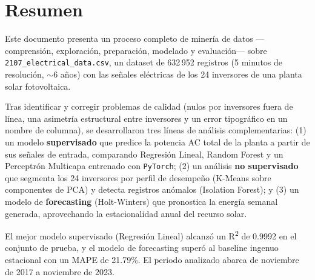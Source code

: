 \section*{Resumen}

Este documento presenta un proceso completo de minería de datos —comprensión, exploración, preparación, modelado y evaluación— sobre \texttt{2107\_electrical\_data.csv}, un dataset de 632\,952 registros (5 minutos de resolución, $\sim$6 años) con las señales eléctricas de los 24 inversores de una planta solar fotovoltaica.

Tras identificar y corregir problemas de calidad (nulos por inversores fuera de línea, una asimetría estructural entre inversores y un error tipográfico en un nombre de columna), se desarrollaron tres líneas de análisis complementarias: (1) un modelo \textbf{supervisado} que predice la potencia AC total de la planta a partir de sus señales de entrada, comparando Regresión Lineal, Random Forest y un Perceptrón Multicapa entrenado con \texttt{PyTorch}; (2) un análisis \textbf{no supervisado} que segmenta los 24 inversores por perfil de desempeño (K-Means sobre componentes de PCA) y detecta registros anómalos (Isolation Forest); y (3) un modelo de \textbf{forecasting} (Holt-Winters) que pronostica la energía semanal generada, aprovechando la estacionalidad anual del recurso solar.

El mejor modelo supervisado (Regresión Lineal) alcanzó un R\textsuperscript{2} de 0.9992 en el conjunto de prueba, y el modelo de forecasting superó al baseline ingenuo estacional con un MAPE de 21.79\%. El periodo analizado abarca de noviembre de 2017 a noviembre de 2023.

\newpage
